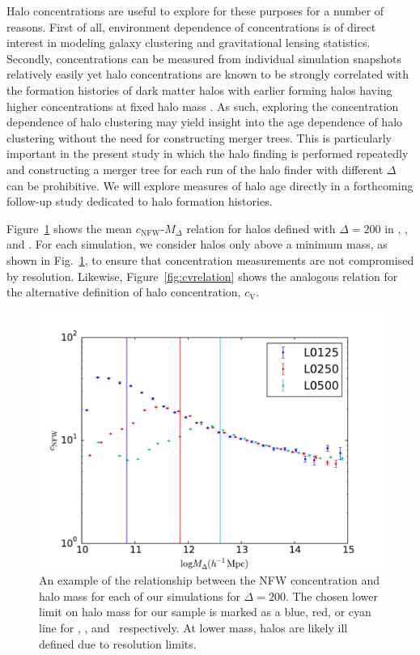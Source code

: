 \documentclass[usenatbib,usegraphicx,letterpaper]{mn2e}
\begin{document}
Halo concentrations are useful to explore for these purposes for a number of reasons. First of all, environment dependence 
of concentrations is of direct interest in modeling galaxy clustering and gravitational lensing statistics. Secondly, 
concentrations can be measured 
from individual simulation snapshots relatively easily yet halo concentrations are known to be strongly correlated with the formation 
histories of dark matter halos with earlier forming halos having higher concentrations at fixed halo mass 
. As such, exploring the concentration dependence of halo clustering may 
yield insight into the age dependence of halo clustering without the need for constructing merger trees. This 
is particularly important in the present study in which the halo finding is performed repeatedly and constructing a 
merger tree for each run of the halo finder with different $\Delta$ can be prohibitive. We will explore measures of 
halo age directly in a forthcoming follow-up study dedicated to halo formation histories.


Figure~\ref{fig:cnfwrelation} shows the mean $c_{\mathrm{NFW}}$-$M_{\Delta}$ relation for halos defined with $\Delta=200$ 
in \simA, \simB, and \simC. For each simulation, we consider halos only above a minimum mass, as shown in Fig.~\ref{fig:cnfwrelation}, to ensure that concentration measurements are not compromised by resolution. Likewise, Figure~\ref{fig:cvrelation} shows the analogous 
relation for the alternative definition of halo concentration, $c_{\mathrm{V}}$. 

\begin{figure}
\centering
\includegraphics[width=.5\textwidth]{masscut_cnfw_d200.pdf}
\caption{An example of the relationship between the NFW concentration and halo mass for each of our simulations for $\Delta =200$. The chosen lower limit on halo mass for our sample is marked as a blue, red, or cyan line for \simA, \simB, and \simC \ respectively. At lower mass, halos are likely ill defined due to resolution limits.}
\label{fig:cnfwrelation}
\end{figure}
\end{document}
